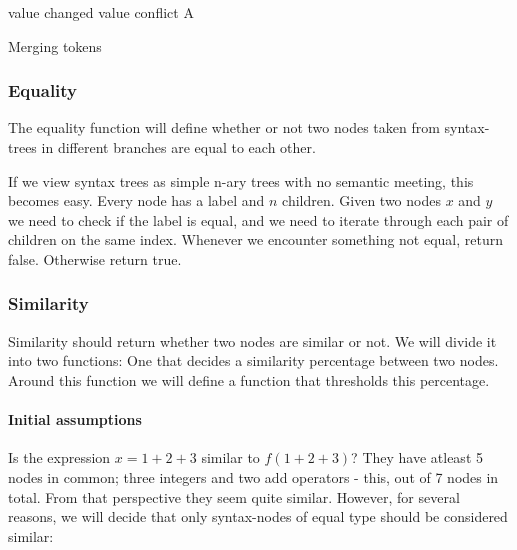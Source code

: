 \documentclass[11pt]{article}
\begin{document}
\begin{algorithm}
\begin{algorithmic}
        \State \Return value
    \EndIf
        \State \Return changed value
    \EndIf
            \State \Return conflict
	    \EndIf
        \State \Return A
    \EndIf
\EndFunction
\end{algorithmic}
  \caption{Merging tokens}
  \label{MergeToken}
\end{algorithm}

\subsubsection{Equality}
The equality function will define whether or not two nodes taken from syntax-trees in different branches are equal to each other.

If we view syntax trees as simple n-ary trees with no semantic meeting, this becomes easy. Every node has a label and $n$ children. Given two nodes $x$ and $y$ we need to check if the label is equal, and we need to iterate through each pair of children on the same index. Whenever we encounter something not equal, return false. Otherwise return true.

\subsubsection{Similarity}
\label{FunctionSimilarity}
Similarity should return whether two nodes are similar or not. We will divide it into two functions:  One that decides a similarity percentage between two nodes. Around this function we will define a function that thresholds this percentage.

\paragraph{Initial assumptions} Is the expression $x=1+2+3$ similar to $f(1+2+3)$? They have atleast 5 nodes in common; three integers and two add operators - this, out of 7 nodes in total. From that perspective they seem quite similar. However, for several reasons, we will decide that only syntax-nodes of equal type should be considered similar:
\end{document}
